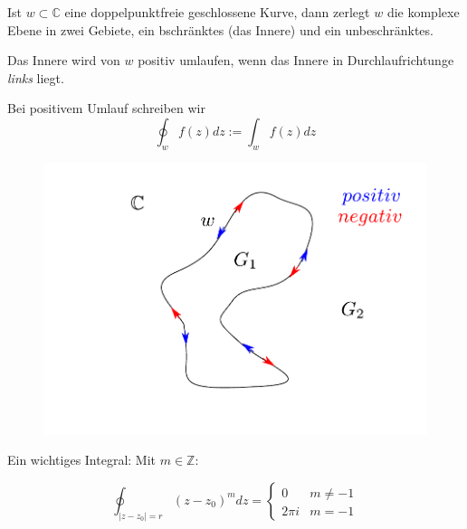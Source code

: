 \documentclass[10pt,a4paper]{article}
\begin{document}
\begin{defi}
Ist $w \subset \mathbb{C}$ eine doppelpunktfreie geschlossene Kurve, dann zerlegt $w$ die komplexe Ebene in zwei Gebiete, ein bschränktes (das Innere) und ein unbeschränktes.

Das Innere wird von $w$ positiv umlaufen, wenn das Innere in Durchlaufrichtunge \emph{links} liegt.

Bei positivem Umlauf schreiben wir $$\oint_{w} f(z) dz := \int_{w} f(z) dz$$

\begin{figure}[H]
\includegraphics[width=\textwidth]{images/umlaufrichtung}
\caption{}
\end{figure}


\end{defi}

Ein wichtiges Integral:
Mit $m \in \mathbb{Z}$:

$$\oint_{|z-z_0|=r} (z-z_0)^{m} dz = 
\left\{  \begin{matrix}
0 & m \not= -1 \\
2 \pi i & m=-1
\end{matrix} \right.$$

\end{document}
